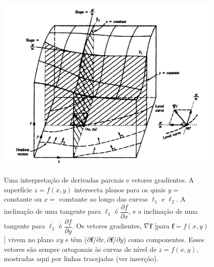\begin{figure}[!ht]
\caption{\small Uma interpretação de derivadas parciais e vetores gradientes. A superfície $z = f(x, y)$ intersecta planos para os quais $y =$ constante ou $x =$ constante ao longo das curvas $\ell_1$ e $\ell_2$. A inclinação de uma tangente para $\ell_1$ é $\dfrac{\partial f}{\partial x}$, e a inclinação de uma tangente para $\ell_2$ é $\dfrac{\partial f}{\partial y}$. Os vetores gradientes, $\nabla \mathbf{f}$ [para $\mathbf{f} = f(x, y)$] vivem no plano $xy$ e têm ($\partial \mathbf{f} / \partial x, \partial \mathbf{f} / \partial y$) como componentes. Esses vetores são sempre ortogonais às curvas de nível de $z = f(x, y)$, mostradas aqui por linhas tracejadas (ver inserção).
}
\centering
\includegraphics[scale=0.5]{figs/leah/fig09.02.png}
\label{fig:09.02}
\end{figure}


